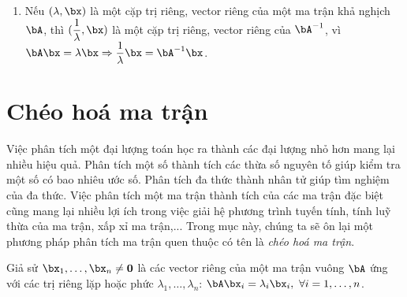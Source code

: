 \begin{enumerate}
    \item Nếu $(\lambda, \bx)$ là một cặp trị riêng, vector riêng của một ma
    trận khả nghịch $\bA$, thì $\displaystyle(\frac{1}{\lambda}, \bx)$ là một
    cặp trị riêng, vector riêng của $\bA^{-1}$, vì $\displaystyle \bA\bx =
    \lambda\bx \Rightarrow \frac{1} {\lambda}\bx = \bA^{-1}\bx$.


\end{enumerate}




\section{Chéo hoá ma trận} %
\label{sec:cheo_hoa_ma_tran}

Việc phân tích một đại lượng toán học ra thành các đại lượng nhỏ hơn mang lại
nhiều hiệu quả. Phân tích một số thành tích các thừa số nguyên tố giúp kiểm tra
một số có bao nhiêu ước số. Phân tích đa thức thành nhân tử giúp tìm nghiệm của
đa thức. Việc phân tích một ma trận thành tích của các ma trận đặc biệt cũng mang lại nhiều lợi ích trong việc giải hệ phương trình tuyến tính,
tính luỹ thừa của ma trận, xấp xỉ ma trận,... Trong mục này, chúng ta sẽ ôn
lại một phương pháp phân tích ma trận quen thuộc có tên là \textit{chéo hoá ma
trận}.

Giả sử $\bx_1, \dots, \bx_n \neq \mathbf{0}$ là các vector riêng của một ma trận
vuông $\bA$ ứng với các trị riêng lặp hoặc phức $\lambda_1, \dots, \lambda_n$:
\begin{math}
    \bA\bx_i = \lambda_i \bx_i, ~\forall i = 1, \dots, n
\end{math}.

